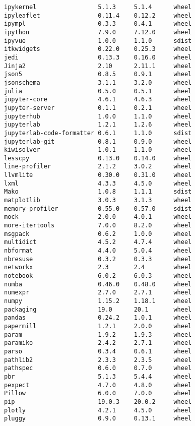 \begin{verbatim}
ipykernel                 5.1.3     5.1.4      wheel
ipyleaflet                0.11.4    0.12.2     wheel
ipympl                    0.3.3     0.4.1      wheel
ipython                   7.9.0     7.12.0     wheel
ipyvue                    1.0.0     1.1.0      sdist
itkwidgets                0.22.0    0.25.3     wheel
jedi                      0.13.3    0.16.0     wheel
Jinja2                    2.10      2.11.1     wheel
json5                     0.8.5     0.9.1      wheel
jsonschema                3.1.1     3.2.0      wheel
julia                     0.5.0     0.5.1      wheel
jupyter-core              4.6.1     4.6.3      wheel
jupyter-server            0.1.1     0.2.1      wheel
jupyterhub                1.0.0     1.1.0      wheel
jupyterlab                1.2.1     1.2.6      wheel
jupyterlab-code-formatter 0.6.1     1.1.0      sdist
jupyterlab-git            0.8.1     0.9.0      wheel
kiwisolver                1.0.1     1.1.0      wheel
lesscpy                   0.13.0    0.14.0     wheel
line-profiler             2.1.2     3.0.2      wheel
llvmlite                  0.30.0    0.31.0     wheel
lxml                      4.3.3     4.5.0      wheel
Mako                      1.0.8     1.1.1      sdist
matplotlib                3.0.3     3.1.3      wheel
memory-profiler           0.55.0    0.57.0     sdist
mock                      2.0.0     4.0.1      wheel
more-itertools            7.0.0     8.2.0      wheel
msgpack                   0.6.2     1.0.0      wheel
multidict                 4.5.2     4.7.4      wheel
nbformat                  4.4.0     5.0.4      wheel
nbresuse                  0.3.2     0.3.3      wheel
networkx                  2.3       2.4        wheel
notebook                  6.0.2     6.0.3      wheel
numba                     0.46.0    0.48.0     wheel
numexpr                   2.7.0     2.7.1      wheel
numpy                     1.15.2    1.18.1     wheel
packaging                 19.0      20.1       wheel
pandas                    0.24.2    1.0.1      wheel
papermill                 1.2.1     2.0.0      wheel
param                     1.9.2     1.9.3      wheel
paramiko                  2.4.2     2.7.1      wheel
parso                     0.3.4     0.6.1      wheel
pathlib2                  2.3.3     2.3.5      wheel
pathspec                  0.6.0     0.7.0      wheel
pbr                       5.1.3     5.4.4      wheel
pexpect                   4.7.0     4.8.0      wheel
Pillow                    6.0.0     7.0.0      wheel
pip                       19.0.3    20.0.2     wheel
plotly                    4.2.1     4.5.0      wheel
pluggy                    0.9.0     0.13.1     wheel

\end{verbatim}
